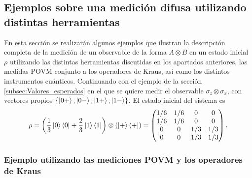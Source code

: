 \subsection{Ejemplos sobre una medición difusa utilizando distintas herramientas} %


En esta sección se realizarán algunos ejemplos que ilustran la descripción completa de la medición de un observable de la forma $A\otimes B$ en un estado inicial $\rho$ utilizando las distintas herramientas discutidas en los apartados anteriores, las medidas POVM conjunto a los operadores de Kraus, así como los distintos instrumentos cuánticos. Continuando con el ejemplo de la sección {\ref{subsec:Valores_esperados}} en el que se quiere medir el observable $\sigma_z\otimes \sigma_x$, con vectores propios $\{\ket{0+},\ket{0-},\ket{1+},\ket{1-}\}$. El estado inicial del sistema es  \begin{equation}\label{eq:estado-ejemplos-2p}\rho= \left(\frac{1}{3}\ket{0}\bra{0}+\frac{2}{3}\ket{1}\bra{1}\right)\otimes\left(\ket{+}\bra{+}\right)=\begin{pmatrix}
    1/6&1/6&0&0\\
    1/6&1/6&0&0\\
    0&0&1/3&1/3\\
    0&0&1/3&1/3\\
\end{pmatrix}.\end{equation}


\subsubsection{Ejemplo utilizando las mediciones POVM y los operadores de Kraus} %


